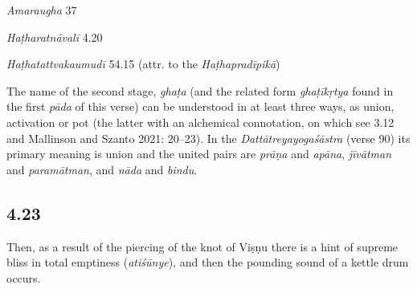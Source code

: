 \begin{ekdosis}
\begin{sources}[hp04_022]
\emph{Amaraugha} 37
\begin{versinnote}
\tl{\var{dvitīye saṅ- ] \emph{Amaraugha} : dvitīyāyāṃ \emph{Amaraughaprabodha}}\\!}
\end{versinnote}
\end{sources}

\begin{testimonia}[hp04_022]
\emph{Haṭharatnāvalī} 4.20
\begin{versinnote}
\end{versinnote}

\emph{Haṭhatattvakaumudī} 54.15 (attr. to the \emph{Haṭhapradīpikā})
\begin{versinnote}
\end{versinnote}
\end{testimonia}

\begin{philcomm}[hp04_022]
The name of the second stage, \emph{ghaṭa} (and the related form \emph{ghaṭīkṛtya} found in the first \emph{pāda} of this verse) can be understood in at least three ways, as union, activation or pot (the latter with an alchemical connotation, on which see 3.12 and Mallinson and Szanto 2021: 20–23). In the \emph{Dattātreyayogaśāstra} (verse 90) its primary meaning is union and the united pairs are \emph{prāṇa} and \emph{apāna}, \emph{jīvātman} and \emph{paramātman}, and \emph{nāda} and \emph{bindu}.
\end{philcomm}

\subsection*{4.23}
\begin{translation}[hp04_021]
Then, as a result of the piercing of the knot of Viṣṇu there is a hint of supreme bliss in total emptiness (\emph{atiśūnye}), and then the pounding sound of a kettle drum occurs.%
\end{translation}


\end{ekdosis}
